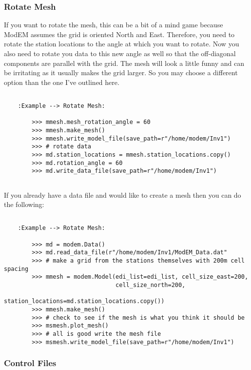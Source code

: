 \subsubsection{Rotate Mesh}
\label{sec:modeling.modem.mesh_rotate}

If you want to rotate the mesh, this can be a bit of a mind game because ModEM assumes the grid is oriented North and East.  Therefore, you need to rotate the station locations to the angle at which you want to rotate.  Now you also need to rotate you data to this new angle as well so that the off-diagonal components are parallel with the grid.  The mesh will look a little funny and can be irritating as it usually makes the grid larger.   So you may choose a different option than the one I've outlined here. 
        
\begin{verbatim}

    :Example --> Rotate Mesh: 
    
        >>> mmesh.mesh_rotation_angle = 60
        >>> mmesh.make_mesh()
        >>> mmesh.write_model_file(save_path=r"/home/modem/Inv1")
        >>> # rotate data
        >>> md.station_locations = mmesh.station_locations.copy()
        >>> md.rotation_angle = 60
        >>> md.write_data_file(save_path=r"/home/modem/Inv1")
        
\end{verbatim}

If you already have a data file and would like to create a mesh then you can do the following:

\begin{verbatim}

	:Example --> Rotate Mesh:
	 
        >>> md = modem.Data()
        >>> md.read_data_file(r"/home/modem/Inv1/ModEM_Data.dat"
        >>> # make a grid from the stations themselves with 200m cell spacing
        >>> mmesh = modem.Model(edi_list=edi_list, cell_size_east=200, 
                                cell_size_north=200, 
                                station_locations=md.station_locations.copy())
        >>> mmesh.make_mesh()
        >>> # check to see if the mesh is what you think it should be
        >>> msmesh.plot_mesh()
        >>> # all is good write the mesh file
        >>> msmesh.write_model_file(save_path=r"/home/modem/Inv1")
\end{verbatim}

\subsubsection{Control Files}
\label{sec:modeling.modem.control}

